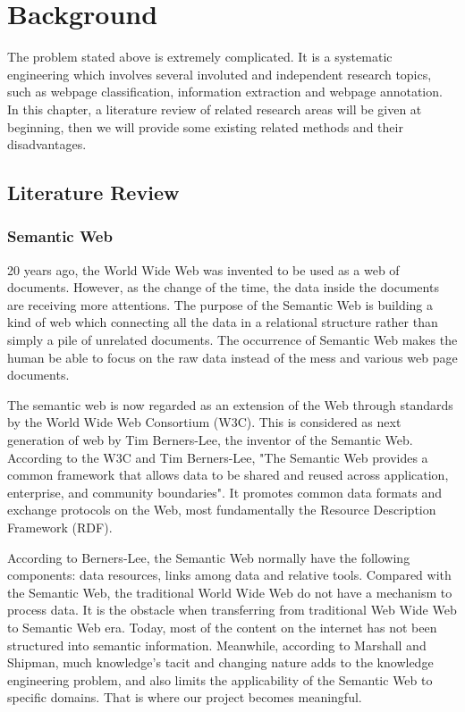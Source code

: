\chapter{Background}\label{chapter:bg}
The problem stated above is extremely complicated. It is a systematic engineering which involves several involuted and independent research topics, such as webpage classification, information extraction and webpage annotation. In this chapter, a literature review of related research areas will be given at beginning, then we will provide some existing related methods and their disadvantages.

\section{Literature Review}
\subsection{Semantic Web}
20 years ago, the World Wide Web was invented to be used as a web of documents. However, as the change of the time, the data inside the documents are receiving more attentions. The purpose of the Semantic Web is building a kind of web which connecting all the data in a relational structure rather than simply a pile of unrelated documents\cite{shadbolt2006semantic}. The occurrence of Semantic Web makes the human be able to focus on the raw data instead of the mess and various web page documents\cite{berners2001semantic,shadbolt2006semantic}.

The semantic web is now regarded as an extension of the Web through standards by the World Wide Web Consortium (W3C). This is considered as next generation of web by Tim Berners-Lee, the inventor of the Semantic Web. According to the W3C and Tim Berners-Lee, "The Semantic Web provides a common framework that allows data to be shared and reused across application, enterprise, and community boundaries". It promotes common data formats and exchange protocols on the Web, most fundamentally the Resource Description Framework (RDF)\cite{berners2001semantic}. 

According to Berners-Lee, the Semantic Web normally have the following components: data resources, links among data and relative tools\cite{berners1998semantic}. Compared with the Semantic Web, the traditional World Wide Web do not have a mechanism to process data. It is the obstacle when transferring from traditional Web Wide Web to Semantic Web era. Today, most of the content on the internet has not been structured into semantic information. Meanwhile, according to Marshall and Shipman, much knowledge's tacit and changing nature  adds to the knowledge engineering problem, and also limits the applicability of the Semantic Web to specific domains\cite{marshall2003semantic}. That is where our project becomes meaningful. 

